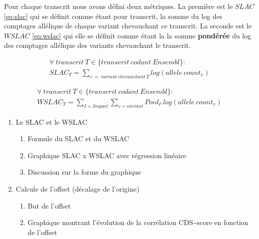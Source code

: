 \documentclass[12pt,twoside]{reedthesis}
\providecommand{\tightlist}{%
  \setlength{\itemsep}{0pt}\setlength{\parskip}{0pt}}
\theoremstyle{definition}
\theoremstyle{definition}
\theoremstyle{remark}
\begin{document}
  Pour chaque transcrit nous avons défini deux métriques. La première est
  le \(SLAC\) \eqref{eq:slac} qui se définit comme étant pour transcrit, la
  somme du log des comptages allélique de chaque variant chevauchant ce
  transcrit. La seconde est le \(WSLAC\) \eqref{eq:wslac} qui elle se
  définit comme étant la la somme \textbf{pondérée} du log des comptages
  allélique des variants chevauchant le transcrit.
  
  \begin{multline} 
    \forall\ transcrit\ T \in \{transcrit\ codant\ Ensembl\} : \\
      SLAC_T = \sum_{v\ =\ variant\ chevauchant\ T}{log(allele\ count_v)}
    \label{eq:slac}
  \end{multline}
  
  \begin{multline} 
    \forall\ transcrit\ T \in \{transcrit\ codant\ Ensembl\} : \\
     WSLAC_T = \sum_{I=Impact}\sum_{v=variant}{Poid_I.log(allele\ count_v)}
    \label{eq:wslac}
  \end{multline}
  
  \begin{enumerate}
  \def\labelenumi{\arabic{enumi}.}
  \tightlist
  \item
    Le SLAC et le WSLAC
  
    \begin{enumerate}
    \def\labelenumii{\alph{enumii}.}
    \tightlist
    \item
      Formule du SLAC et du WSLAC\\
    \item
      Graphique SLAC x WSLAC avec régression linéaire\\
    \item
      Discussion sur la forme du graphique
    \end{enumerate}
  \item
    Calcule de l'offset (décalage de l'origine)
  
    \begin{enumerate}
    \def\labelenumii{\alph{enumii}.}
    \tightlist
    \item
      But de l'offset\\
    \item
      Graphique montrant l'évolution de la corrélation
      CDS\textasciitilde{}score en fonction de l'offset
    \end{enumerate}
  \end{enumerate}
  
\end{document}
